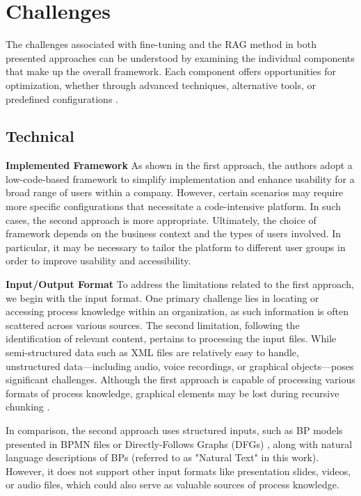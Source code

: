 \documentclass[%
    paper=A4,                    %
    twoside=true,               %
    openright,                  %
    parskip=full,               %
    chapterprefix=true,         %
    11pt,                       %
    headings=normal,            %
    bibliography=totoc,         %
    listof=totoc,              %
    titlepage=on,              %
    captions=tableabove,        %
    draft=false,               %
]{scrreprt}%
\begin{document}
  
    


    \chapter{Challenges}
    \label{challenges}
    
   
   The challenges associated with fine-tuning and the RAG method in both presented approaches can be understood by examining the individual components that make up the overall framework. Each component offers opportunities for optimization, whether through advanced techniques, alternative tools, or predefined configurations \cite{gupta2024comprehensive, bernardi2024conversing, franzoi2024using}.
    
    
    \section{Technical}
    
     \textbf{Implemented Framework}\hspace{0.5em}
    As shown in the first approach, the authors adopt a low-code-based framework to simplify implementation and enhance usability for a broad range of users within a company. However, certain scenarios may require more specific configurations that necessitate a code-intensive platform. In such cases, the second approach is more appropriate.
    Ultimately, the choice of framework depends on the business context and the types of users involved. In particular, it may be necessary to tailor the platform to different user groups in order to improve usability and accessibility.
    

    
   \textbf{Input/Output Format}\hspace{0.5em}
   To address the limitations related to the first approach, we begin with the input format. One primary challenge lies in locating or accessing process knowledge within an organization, as such information is often scattered across various sources.
   The second limitation, following the identification of relevant content, pertains to processing the input files. While semi-structured data such as XML files are relatively easy to handle, unstructured data—including audio, voice recordings, or graphical objects—poses significant challenges. Although the first approach is capable of processing various formats of process knowledge, graphical elements may be lost during recursive chunking \cite{franzoi2024using}.
   
   In comparison, the second approach uses structured inputs, such as BP models presented in BPMN files or Directly-Follows Graphs (DFGs) \cite{VANDERAALST2019321}, along with natural language descriptions of BPs (referred to as "Natural Text" in this work). However, it does not support other input formats like presentation slides, videos, or audio files, which could also serve as valuable sources of process knowledge.
   
\end{document}
